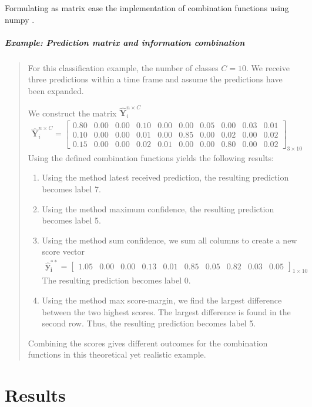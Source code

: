 Formulating as matrix ease the implementation of combination functions using \gls{numpy} \cite{oliphant_numpy:_2006}. 
\subparagraph{Example: Prediction matrix and information combination} 
\blockquote[]{	 	
	For this classification example, the number of classes $C=10$. We receive three predictions within a time frame and assume the predictions have been expanded.
	
	We construct the matrix $ \bm{\hat{Y}}_{i}^{n \times C} $
	\begin{align*}
	\bm{\hat{Y}}_{i}^{n \times C} =
	\begin{bmatrix}
	0.80 & 0.00 & 0.00 & 0.10 & 0.00 & 0.00 & 0.05 & 0.00 & 0.03 & 0.01 \\
	0.10 & 0.00 & 0.00 & 0.01 & 0.00 & 0.85 & 0.00 & 0.02 & 0.00 & 0.02 \\
	0.15 & 0.00 & 0.00 & 0.02 & 0.01 & 0.00 & 0.00 & 0.80 & 0.00 & 0.02 
	\end{bmatrix}_{3 \times 10}
	\end{align*}
	Using the defined combination functions yields the following results:
	\begin{enumerate}
		\item Using the method latest received prediction, the resulting prediction becomes label 7.
		\item Using the method maximum confidence, the resulting prediction becomes label 5.
		\item Using the method sum confidence, we sum all columns to create a new score vector
		\begin{align*}
		\bm{\hat{y}^{**}_{i}} = 
		\begin{bmatrix}
		1.05 & 0.00 & 0.00 & 0.13 & 0.01 & 0.85 & 0.05 & 0.82 & 0.03 & 0.05
		\end{bmatrix}_{1 \times 10}
		\end{align*}
		The resulting prediction becomes label 0.
		\item Using the method max score-margin, we find the largest difference between the two highest scores. The largest difference is found in the second row. Thus, the resulting prediction becomes label 5.
	\end{enumerate}
	Combining the scores gives different outcomes for the combination functions in this theoretical yet realistic example.
	
}

\section{Results} \label{sec:edge-results}

